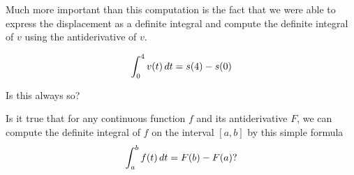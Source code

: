 \documentclass{ximera}
\begin{document}
\begin{example}
Much more important than this computation is the fact that we were able to express the displacement as a definite integral and  compute the definite integral  of $v$ using the antiderivative of $v$.

 \[
   \int_{0}^{4}v(t)\mathop{}\!d t=s(4)-s(0)
\]

Is this always so?

Is it true that for any continuous function $f$ and its antiderivative $F$, we can compute the definite integral of $f$ on the interval $[a,b]$ by this simple formula
\[
   \int_{a}^{b}f(t)\mathop{}\!d t=F(b)-F(a)?
\]

\end{example}
%
%
\end{document}
